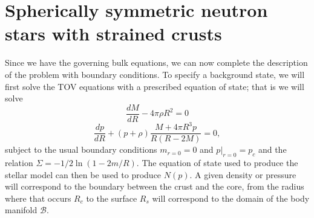 \section{Spherically symmetric neutron stars with strained crusts}
Since we have the governing bulk equations, we can now complete the description of the problem with boundary conditions. To specify a background state, we will first solve the TOV equations with a prescribed equation of state; that is we will solve
\begin{equation}
\frac{dM}{dR} - 4\pi\rho R^2=0
\end{equation}
\begin{equation}
\frac{dp}{dR} + (p+\rho)\frac{M+4\pi R^3p}{R(R-2M)} = 0,
\end{equation}
subject to the usual boundary conditions $m_{r=0}=0$ and $p|_{r=0}=p_c$ and the relation $\Sigma = -1/2\ln(1 - 2m/R)$. The equation of state used to produce the stellar model can then be used to produce $N(p)$. A given density or pressure will correspond to the boundary between the crust and the core, from the radius where that occurs $R_c$ to the surface $R_s$ will correspond to the domain of the body manifold $\mathcal{B}$.

